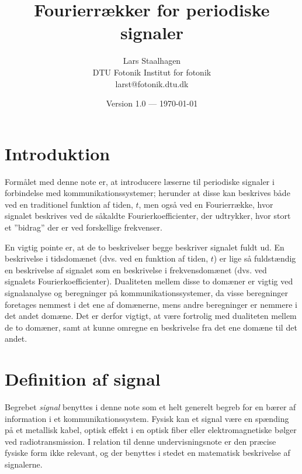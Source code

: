 \documentclass[11pt,a4paper]{article}
\begin{document}
\title{Fourierrækker for periodiske signaler}
\author{Lars Staalhagen \\ DTU Fotonik Institut for fotonik \\ larst@fotonik.dtu.dk }
\date{\small{}Version 1.0 --- \today}
\maketitle

\section{Introduktion}
Formålet med denne note er, at introducere læserne til periodiske signaler i forbindelse med kommunikationssystemer; herunder at disse kan beskrives både ved en traditionel funktion af tiden, $t$, men også ved en Fourierrække, hvor signalet beskrives ved de såkaldte Fourierkoefficienter, der udtrykker, hvor stort et ''bidrag'' der er ved forskellige frekvenser.

En vigtig pointe er, at de to beskrivelser begge beskriver signalet fuldt ud. En beskrivelse i tidsdomænet (dvs. ved en funktion af tiden, $t$) er lige så fuldstændig en beskrivelse af signalet som en beskrivelse i frekvensdomænet (dvs. ved signalets Fourierkoefficienter). Dualiteten mellem disse to domæner er vigtig ved signalanalyse og beregninger på kommunikationssystemer, da visse beregninger foretages nemmest i det ene af domænerne, mens andre beregninger er nemmere i det andet domæne. Det er derfor vigtigt, at være fortrolig med dualiteten mellem de to domæner, samt at kunne omregne en beskrivelse fra det ene domæne til det andet.


\section{Definition af signal}
Begrebet \emph{signal} benyttes i denne note som et helt generelt begreb for en bærer af information i et kommunikationssystem. Fysisk kan et signal være en spænding på et metallisk kabel, optisk effekt i en optisk fiber eller elektromagnetiske bølger ved radiotransmission. I relation til denne undervisningsnote er den præcise fysiske form ikke relevant, og der benyttes i stedet en matematisk beskrivelse af signalerne.
\end{document}
